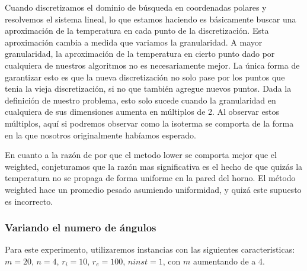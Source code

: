 Cuando discretizamos el dominio de búsqueda en coordenadas polares y resolvemos el sistema lineal, lo que estamos haciendo es básicamente buscar una aproximación de la temperatura en cada punto de la discretización. Esta aproximación cambia a medida que variamos la granularidad. A mayor granularidad, la aproximación de la temperatura en cierto punto dado por cualquiera de nuestros algoritmos no es necesariamente mejor. La única forma de garantizar esto es que la nueva discretización no solo pase por los puntos que tenia la vieja discretización, si no que también agregue nuevos puntos. Dada la definición de nuestro problema, esto solo sucede cuando la granularidad en cualquiera de sus dimensiones aumenta en múltiplos de 2. Al observar estos múltiplos, aquí si podremos observar como la isoterma se comporta de la forma en la que nosotros originalmente habíamos esperado.

En cuanto a la razón de por que el metodo lower se comporta mejor que el weighted, conjeturamos que la razón mas significativa es el hecho de que quizás la temperatura no se propaga de forma uniforme en la pared del horno. El método weighted hace un promedio pesado asumiendo uniformidad, y quizá este supuesto es incorrecto.

\pagebreak

\subsubsection{Variando el numero de ángulos}

Para este experimento, utilizaremos instancias con las siguientes caracteristicas: $m = 20$, $n = 4$, $r_i = 10$, $r_e = 100$, $ninst = 1$, con $m$ aumentando de a 4.

